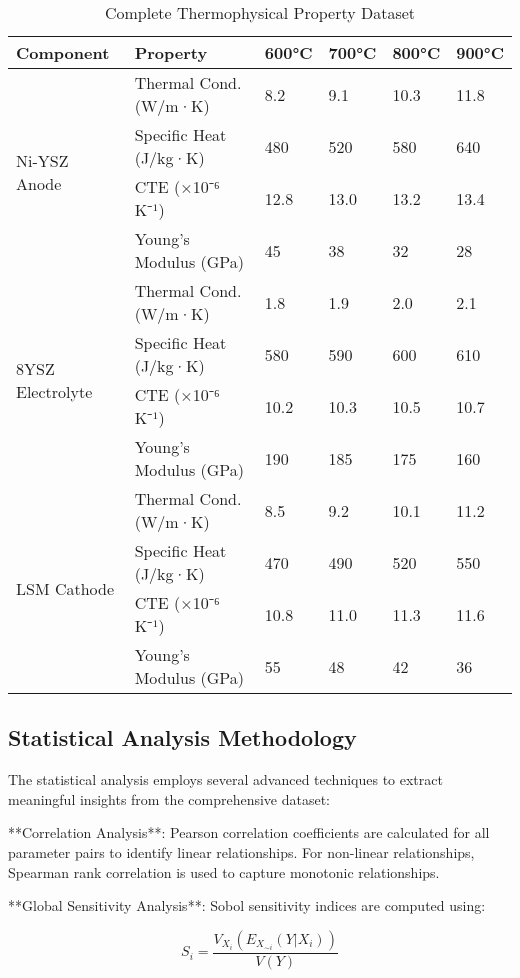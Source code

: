 \documentclass[10pt,conference]{IEEEtran}
\begin{document}
\begin{table}[H]
\centering
\caption{Complete Thermophysical Property Dataset}
\label{tab:complete_thermophysical}
\begin{tabular}{@{}llllll@{}}
\toprule
Component & Property & 600°C & 700°C & 800°C & 900°C \\
\midrule
\multirow{4}{*}{Ni-YSZ Anode} & Thermal Cond. (W/m·K) & 8.2 & 9.1 & 10.3 & 11.8 \\
& Specific Heat (J/kg·K) & 480 & 520 & 580 & 640 \\
& CTE (×10⁻⁶ K⁻¹) & 12.8 & 13.0 & 13.2 & 13.4 \\
& Young's Modulus (GPa) & 45 & 38 & 32 & 28 \\
\midrule
\multirow{4}{*}{8YSZ Electrolyte} & Thermal Cond. (W/m·K) & 1.8 & 1.9 & 2.0 & 2.1 \\
& Specific Heat (J/kg·K) & 580 & 590 & 600 & 610 \\
& CTE (×10⁻⁶ K⁻¹) & 10.2 & 10.3 & 10.5 & 10.7 \\
& Young's Modulus (GPa) & 190 & 185 & 175 & 160 \\
\midrule
\multirow{4}{*}{LSM Cathode} & Thermal Cond. (W/m·K) & 8.5 & 9.2 & 10.1 & 11.2 \\
& Specific Heat (J/kg·K) & 470 & 490 & 520 & 550 \\
& CTE (×10⁻⁶ K⁻¹) & 10.8 & 11.0 & 11.3 & 11.6 \\
& Young's Modulus (GPa) & 55 & 48 & 42 & 36 \\
\bottomrule
\end{tabular}
\end{table}

\subsection{Statistical Analysis Methodology}

The statistical analysis employs several advanced techniques to extract meaningful insights from the comprehensive dataset:

**Correlation Analysis**: Pearson correlation coefficients are calculated for all parameter pairs to identify linear relationships. For non-linear relationships, Spearman rank correlation is used to capture monotonic relationships.

**Global Sensitivity Analysis**: Sobol sensitivity indices are computed using:

\begin{equation}
S_i = \frac{V_{X_i}(E_{X_{\sim i}}(Y|X_i))}{V(Y)}
\end{equation}
\end{document}
